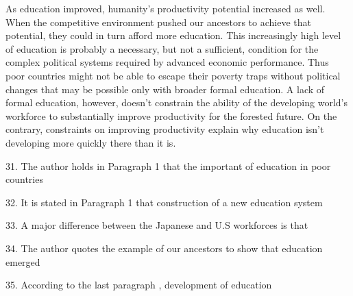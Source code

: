 \qquad As education improved, humanity's productivity potential increased as well. When the competitive environment pushed our ancestors to achieve that potential, they could in turn afford more education. This increasingly high level of education is probably a necessary, but not a sufficient, condition for the complex political systems required by advanced economic performance. Thus poor countries might not be able to escape their poverty traps without political changes that may be possible only with broader formal education. A lack of formal education, however, doesn't constrain the ability of the developing world's workforce to substantially improve productivity for the forested future. On the contrary, constraints on improving productivity explain why education isn't developing more quickly there than it is.

\vspace{6pt}

31. The author holds in Paragraph 1 that the important of education in poor countries\par

32. It is stated in Paragraph 1 that construction of a new education system\par

33. A major difference between the Japanese and U.S workforces is that\par

34. The author quotes the example of our ancestors to show that education emerged\par

35. According to the last paragraph , development of education\par
